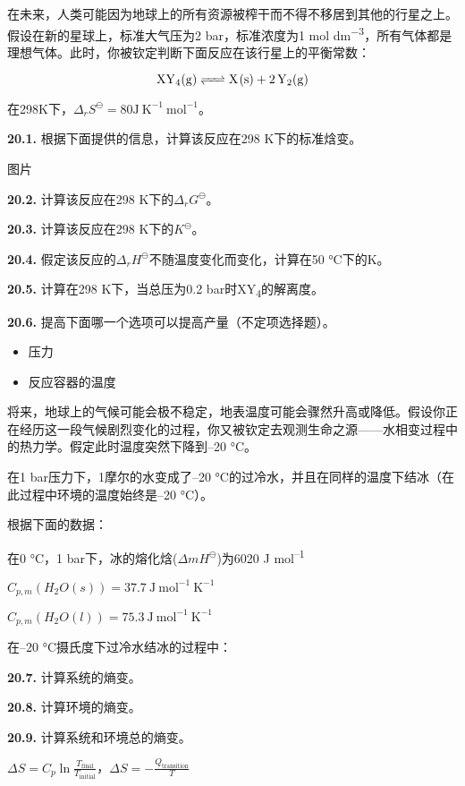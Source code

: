 在未来，人类可能因为地球上的所有资源被榨干而不得不移居到其他的行星之上。假设在新的星球上，标准大气压为2 bar，标准浓度为1 mol
dm\textsuperscript{−3}，所有气体都是理想气体。此时，你被钦定判断下面反应在该行星上的平衡常数：

$$\ce{XY4(g) <=> X(s) + 2Y2(g)}$$

在298K下，\(\Delta_r S^\ominus = 80 \mathrm {J\ K^{-1}\ mol^{-1}}\)。

\noindent\textbf{20.1.} 根据下面提供的信息，计算该反应在298 K下的标准焓变。

图片

\noindent\textbf{20.2.} 计算该反应在298 K下的$\Delta_r G^{\ominus}$。

\noindent\textbf{20.3.} 计算该反应在298 K下的$K^\ominus$。

\noindent\textbf{20.4.} 假定该反应的$\Delta_rH^{\ominus}$不随温度变化而变化，计算在50 °C下的K。

\noindent\textbf{20.5.} 计算在298 K下，当总压为0.2 bar时XY\textsubscript{4}的解离度。

\noindent\textbf{20.6. } 提高下面哪一个选项可以提高产量（不定项选择题）。

\renewcommand{\labelitemi}{$\square$}
\begin{itemize}
	\item 压力
	\item 反应容器的温度
\end{itemize}
\renewcommand{\labelitemi}{$\bullet$}

将来，地球上的气候可能会极不稳定，地表温度可能会骤然升高或降低。假设你正在经历这一段气候剧烈变化的过程，你又被钦定去观测生命之源------水相变过程中的热力学。假定此时温度突然下降到--20
°C。

在1 bar压力下，1摩尔的水变成了--20 °C的过冷水，并且在同样的温度下结冰（在此过程中环境的温度始终是--20 °C）。

根据下面的数据：

在0 °C，1 bar下，冰的熔化焓(\(\Delta m H^\ominus\))为6020 J mol\textsuperscript{--1}

\(C_{p,m}(H_2O(s)) = 37.7\ \mathrm{J\ mol^{-1}\ K^{-1}}\)

\(C_{p,m}(H_2O(l)) = 75.3\ \mathrm{J\ mol^{-1}\ K^{-1}}\)

在--20 °C摄氏度下过冷水结冰的过程中：

\noindent\textbf{20.7.} 计算系统的熵变。

\noindent\textbf{20.8.} 计算环境的熵变。

\noindent\textbf{20.9.} 计算系统和环境总的熵变。

\(\Delta S = C_p\ln \frac{T_{\mathrm{final}}}{T_{\mathrm{initial}}}\)，\(\Delta S = - \frac{Q_{\mathrm{transition}}}{T}\)

